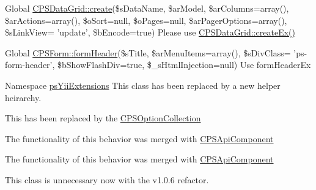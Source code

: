 \label{deprecated__deprecated000007}
\hypertarget{deprecated__deprecated000007}{}
 
\begin{DoxyDescription}
\item[Global \hyperlink{classCPSDataGrid_a4f277aa7b3be8aead6d545302ac7c84b}{CPSDataGrid::create}(\$sDataName, \$arModel, \$arColumns=array(), \$arActions=array(), \$oSort=null, \$oPages=null, \$arPagerOptions=array(), \$sLinkView= 'update', \$bEncode=true) ]Please use \hyperlink{classCPSDataGrid_aea971c9c726d0e1a6f345c986cca7ded}{CPSDataGrid::createEx()} 
\end{DoxyDescription}

\label{deprecated__deprecated000005}
\hypertarget{deprecated__deprecated000005}{}
 
\begin{DoxyDescription}
\item[Global \hyperlink{classCPSForm_abdc7cb1b60d042a0308ef8885a4ea842}{CPSForm::formHeader}(\$sTitle, \$arMenuItems=array(), \$sDivClass= 'ps-\/form-\/header', \$bShowFlashDiv=true, \$\_\-sHtmlInjection=null) ]Use formHeaderEx 
\end{DoxyDescription}

\label{deprecated__deprecated000001}
\hypertarget{deprecated__deprecated000001}{}
 
\begin{DoxyDescription}
\item[Namespace \hyperlink{namespacepsYiiExtensions}{psYiiExtensions} ]This class has been replaced by a new helper heirarchy. 

This has been replaced by the \hyperlink{classCPSOptionCollection}{CPSOptionCollection} 

The functionality of this behavior was merged with \hyperlink{classCPSApiComponent}{CPSApiComponent} 

The functionality of this behavior was merged with \hyperlink{classCPSApiComponent}{CPSApiComponent} 

This class is unnecessary now with the v1.0.6 refactor. 
\end{DoxyDescription}